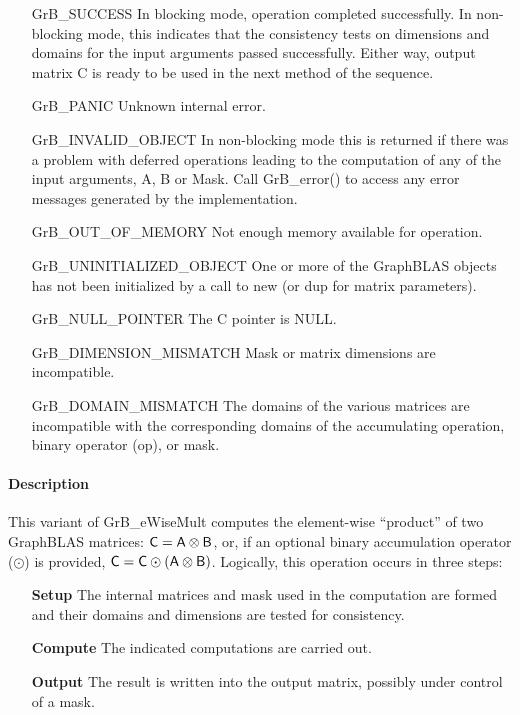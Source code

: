 \begin{itemize}[leftmargin=2.1in]
    \item[{\sf GrB\_SUCCESS}]         In blocking mode, operation completed
    successfully. In non-blocking mode, this indicates that the consistency 
    tests on dimensions and domains for the input arguments passed successfully. 
    Either way, output matrix {\sf C} is ready to be used in the next method of 
    the sequence.

    \item[{\sf GrB\_PANIC}]           Unknown internal error.
    
    \item[{\sf GrB\_INVALID\_OBJECT}] In non-blocking mode this is returned if
    there was a problem with deferred operations leading to the computation of
    any of the input arguments, {\sf A}, {\sf B} or {\sf Mask}.  Call 
    {GrB\_error()} to access any error messages generated by the implementation.

    \item[{\sf GrB\_OUT\_OF\_MEMORY}] Not enough memory available for operation.
    
    \item[{\sf GrB\_UNINITIALIZED\_OBJECT}] One or more of the GraphBLAS objects 
    has not been initialized by a call to {\sf new} (or {\sf dup} for matrix
    parameters).
    
    \item[{\sf GrB\_NULL\_POINTER}]  The {\sf C} pointer is {\sf NULL}.

    \item[{\sf GrB\_DIMENSION\_MISMATCH}] Mask or matrix dimensions are incompatible.

	\item[{\sf GrB\_DOMAIN\_MISMATCH}]    The domains of the various
	matrices are incompatible with the corresponding domains of the
	accumulating operation, binary operator ({\sf op}), or mask.
\end{itemize}

\paragraph{Description}

This variant of {\sf GrB\_eWiseMult} computes the element-wise ``product'' of
two GraphBLAS matrices: ${\sf C} = {\sf A} \otimes {\sf B}$, or, if an optional
binary accumulation operator ($\odot$) is provided, ${\sf C} = {\sf C} \odot
\left({\sf A} \otimes {\sf B}\right)$.  Logically, this operation occurs in
three steps:
\begin{enumerate}[leftmargin=0.75in]
\item[\bf Setup] The internal matrices and mask used in the computation are formed 
and their domains and dimensions are tested for consistency.
\item[\bf Compute] The indicated computations are carried out.
\item[\bf Output] The result is written into the output matrix, possibly under 
control of a mask.
\end{enumerate}

